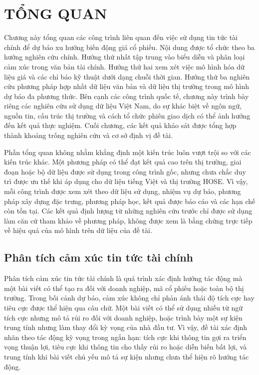 \documentclass[12pt, a4paper, oneside]{report}
\begin{document}
\chapter{TỔNG QUAN}
\label{ch:tong-quan}

Chương này tổng quan các công trình liên quan đến việc sử dụng tin tức tài chính để dự báo xu hướng biến động giá cổ phiếu. Nội dung được tổ chức theo ba hướng nghiên cứu chính. Hướng thứ nhất tập trung vào biểu diễn và phân loại cảm xúc trong văn bản tài chính. Hướng thứ hai xem xét việc mô hình hóa dữ liệu giá và các chỉ báo kỹ thuật dưới dạng chuỗi thời gian. Hướng thứ ba nghiên cứu phương pháp hợp nhất dữ liệu văn bản và dữ liệu thị trường trong mô hình dự báo đa phương thức. Bên cạnh các công trình quốc tế, chương này trình bày riêng các nghiên cứu sử dụng dữ liệu Việt Nam, do sự khác biệt về ngôn ngữ, nguồn tin, cấu trúc thị trường và cách tổ chức phiên giao dịch có thể ảnh hưởng đến kết quả thực nghiệm. Cuối chương, các kết quả khảo sát được tổng hợp thành khoảng trống nghiên cứu và cơ sở định vị đề tài.

Phần tổng quan không nhằm khẳng định một kiến trúc luôn vượt trội so với các kiến trúc khác. Một phương pháp có thể đạt kết quả cao trên thị trường, giai đoạn hoặc bộ dữ liệu được sử dụng trong công trình gốc, nhưng chưa chắc duy trì được ưu thế khi áp dụng cho dữ liệu tiếng Việt và thị trường HOSE. Vì vậy, mỗi công trình được xem xét theo dữ liệu sử dụng, nhiệm vụ dự báo, phương pháp xây dựng đặc trưng, phương pháp học, kết quả được báo cáo và các hạn chế còn tồn tại. Các kết quả định lượng từ những nghiên cứu trước chỉ được sử dụng làm căn cứ tham khảo về phương pháp, không được xem là bằng chứng trực tiếp về hiệu quả của mô hình trên dữ liệu của đề tài.
\section{Phân tích cảm xúc tin tức tài chính}
\label{sec:tq-sentiment}

Phân tích cảm xúc tin tức tài chính là quá trình xác định hướng tác động mà một bài
viết có thể tạo ra đối với doanh nghiệp, mã cổ phiếu hoặc toàn bộ thị trường. Trong
bối cảnh dự báo, cảm xúc không chỉ phản ánh thái độ tích cực hay tiêu cực được thể hiện
qua câu chữ. Một bài viết có thể sử dụng nhiều từ ngữ tích cực nhưng mô tả rủi ro đối
với doanh nghiệp, hoặc trình bày một sự kiện trung tính nhưng làm thay đổi kỳ vọng của
nhà đầu tư. Vì vậy, đề tài xác định nhãn theo tác động kỳ vọng trong ngắn hạn: tích cực
khi thông tin gợi ra triển vọng thuận lợi, tiêu cực khi thông tin cho thấy rủi ro hoặc
diễn biến bất lợi, và trung tính khi bài viết chủ yếu mô tả sự kiện nhưng chưa thể hiện
rõ hướng tác động.
\end{document}
